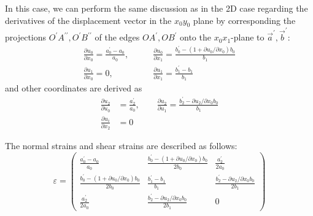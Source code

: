 \documentclass[]{article}
\theoremstyle{definition}
\newcommand{\parderiv}[2]{\frac{\partial #1}{\partial #2}}
\begin{document}
In this case, we can perform the same discussion as in the 2D case regarding the derivatives of the displacement vector in the $x_0y_0$ plane 
by corresponding the projections $O^\prime A^{\prime\prime}, O^\prime B^{\prime\prime}$ of the edges $OA^\prime, OB^\prime$ onto the $x_0x_1$-plane to $\vec{a}^\prime, \vec{b}^\prime$:
\begin{equation}
    \begin{aligned}
        \parderiv{u_0}{x_0} = \frac{a^\prime_0-a_0}{a_0},&\qquad\parderiv{u_0}{x_1} = \frac{b^\prime_0-(1 + \partial u_0/\partial x_0) b_0}{b_1}\\
        \parderiv{u_1}{x_0} = 0,&\qquad\parderiv{u_1}{x_1} = \frac{b^\prime_1 - b_1}{b_1}
    \end{aligned}
\end{equation}
and other coordinates are derived as
\begin{equation}
    \begin{aligned}
        \parderiv{u_2}{u_0} &= \frac{a_2^\prime}{a_0}, \qquad \parderiv{u_2}{u_1} = \frac{b_2^\prime - \partial u_2/\partial x_0 b_0}{b_1}\\
        \parderiv{u_i}{x_2} &= 0            
    \end{aligned}
\end{equation}

The normal strains and shear strains are described as follows:
\begin{equation}
    \mathbb{\varepsilon} = 
    \begin{pmatrix}
        \frac{a_0^\prime-a_0}{a_0} & \frac{b_0^\prime-(1+\partial u_0/\partial x_0)b_0}{2b_0} & \frac{a_2^\prime}{2a_0} \\
        \frac{b_0^\prime-(1+\partial u_0/\partial x_0)b_0}{2b_0} & \frac{b_1^\prime - b_1}{b_1} & \frac{b_2^\prime - \partial u_2/\partial x_0 b_0}{2b_1}\\
        \frac{a_2^\prime}{2a_0} &  \frac{b_2^\prime - \partial u_2/\partial x_0 b_0}{2b_1} & 0
    \end{pmatrix}
\end{equation}
\end{document}
